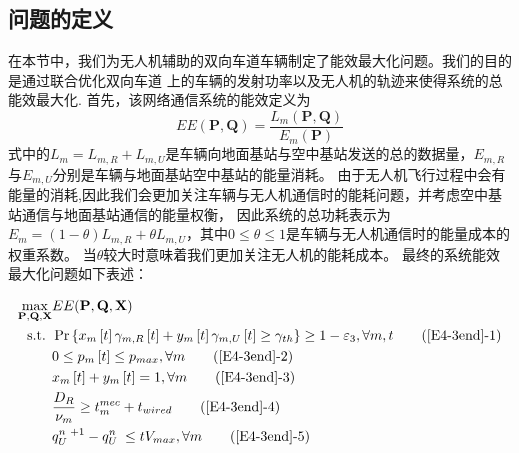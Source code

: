 \subsection{问题的定义}\label{section4-2-3}
在本节中，我们为无人机辅助的双向车道车辆制定了能效最大化问题。我们的目的是通过联合优化双向车道
上的车辆的发射功率以及无人机的轨迹来使得系统的总能效最大化.
首先，该网络通信系统的能效定义为
\begin{equation} \label{E4-12}
EE(\mathbf{P}, \mathbf{Q})=
{\frac{{{L}_{m}}\left( \mathbf{P}, \mathbf{Q} \right)}
{{{E}_{m}}\left( \mathbf{P} \right)}}
\end{equation}
式中的${{L}_{m}={L}_{m,R}+{L}_{m,U}}$是车辆向地面基站与空中基站发送的总的数据量，${E}_{m,R}$与${E}_{m,U}$分别是车辆与地面基站空中基站的能量消耗。
由于无人机飞行过程中会有能量的消耗,因此我们会更加关注车辆与无人机通信时的能耗问题，并考虑空中基站通信与地面基站通信的能量权衡，
因此系统的总功耗表示为${{E}_{m}=(1-\theta){L}_{m,R}+\theta{L}_{m,U}}$，其中$0\le \theta \le 1$是车辆与无人机通信时的能量成本的权重系数。
当$\theta$较大时意味着我们更加关注无人机的能耗成本。
最终的系统能效最大化问题如下表述：

\begin{align}
\max _{ \mathbf{P}, \mathbf{Q}, \mathbf{X} }  & EE(\mathbf{P}, \mathbf{Q}, \mathbf{X})                \label{E4-3end}\\
\text { s.t. }
& \Pr\left\{x_m\left[t\right]\gamma_{m,R}\left[t\right]+
y_m\left[t\right]\gamma_{m,U}\left[t\right]\geq \gamma_{th}\right\}\geq1-
\varepsilon_3, \forall m,t                                               \tag{\ref{E4-3end}{-1}}      \label{E4-3end1}\\  %
& 0\le p_m\left[t\right]\le p_{max}, \forall m                           \tag{\ref{E4-3end}{-2}}      \label{E4-3end2}\\  %
& x_m\left[t\right] + y_m\left[t\right]=1, \forall m                     \tag{\ref{E4-3end}{-3}}      \label{E4-3end3}\\  %
& \frac{D_R}{\nu_m} \geq t_{m}^{mec}+t_{wired}                           \tag{\ref{E4-3end}{-4}}      \label{E4-3end4}\\  %
& q_U^{n\mathrm{\ }+1}-q_U^{n\mathrm{\ }}\le tV_{max}, \forall m         \tag{\ref{E4-3end}{-5}}      \label{E4-3end5}    %
\end{align}

